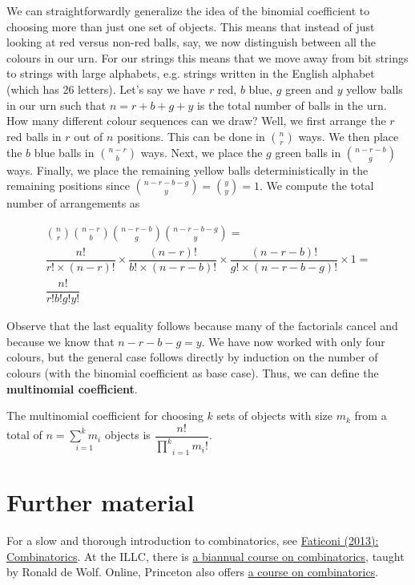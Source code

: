 \documentclass[a4paper,11pt,leqno]{report}
\begin{document}
We can straightforwardly generalize the idea of the binomial coefficient to choosing more than just one set of objects. This means that instead of just
looking at red versus non-red balls, say, we now distinguish between all the colours in our urn. For our strings this means that we move away from
bit strings to strings with large alphabets, e.g. strings written in the English alphabet (which has 26 letters). Let's say we have $ r $ red, 
$ b $ blue, $ g $ green and $ y $ yellow balls in our urn such that $ n = r+b+g+y $ is the total number of balls in the urn. How many different
colour sequences can we draw? Well, we first arrange the $ r $ red balls in $ r $ out of $ n $ positions. This can be done in 
$ \binom{n}{r} $ ways. We then place the $ b $ blue balls in $ \binom{n-r}{b} $ ways. Next, we place the $ g $ green balls in $ \binom{n-r-b}{g} $
ways. Finally, we place the remaining yellow balls deterministically in the remaining positions since $ \binom{n-r-b-g}{y} = \binom{y}{y} = 1  $.
We compute the total number of arrangements as

\begin{gather}
\binom{n}{r} \binom{n-r}{b} \binom{n-r-b}{g} \binom{n-r-b-g}{y} = \\
\dfrac{n!}{r!\times (n-r)!} \times \dfrac{(n-r)!}{b!\times (n-r-b)!} \times \dfrac{(n-r-b)!}{g! \times (n-r-b-g)!} \times 1 = \\
\dfrac{n!}{r!b!g!y!}
\end{gather}

Observe that the last equality follows because many of the factorials cancel and because we know that $ n-r-b-g = y $. We have now worked with
only four colours, but the general case follows directly by induction on the number of colours (with the binomial coefficient as base case). 
Thus, we can define the \textbf{multinomial coefficient}.

\begin{Definition}
The multinomial coefficient for choosing $ k $ sets of objects with size $ m_{k} $ from a total of $ n = \underset{i=1}{\overset{k}{\sum}m_{i}} $ 
objects is $ \dfrac{n!}{\underset{i=1}{\overset{k}{\prod}}m_{i}!} $.
\end{Definition}

\section*{Further material}
For a slow and thorough introduction to combinatorics, see \href{http://eu.wiley.com/WileyCDA/WileyTitle/productCd-111840436X.html}{Faticoni (2013): 
Combinatorics}. At the ILLC, there is \href{http://homepages.cwi.nl/~rdewolf/combinatorics14.html}{a biannual course on combinatorics}, 
taught by Ronald de Wolf. Online, Princeton also offers \href{https://www.coursera.org/course/ac}{a course on combinatorics}.
\end{document}
